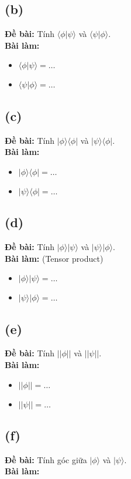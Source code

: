 \subsection{(b)}
\textbf{Đề bài:} Tính $\langle\phi|\psi\rangle$ và $\langle\psi|\phi\rangle$.\\
\textbf{Bài làm:}
\begin{itemize}
    \item $\langle\phi|\psi\rangle = \dots$
    \item $\langle\psi|\phi\rangle = \dots$
\end{itemize}

\subsection{(c)}
\textbf{Đề bài:} Tính $|\phi\rangle\langle\phi|$ và $|\psi\rangle\langle\phi|$.\\
\textbf{Bài làm:}
\begin{itemize}
    \item $|\phi\rangle\langle\phi| = \dots$
    \item $|\psi\rangle\langle\phi| = \dots$
\end{itemize}

\subsection{(d)}
\textbf{Đề bài:} Tính $|\phi\rangle|\psi\rangle$ và $|\psi\rangle|\phi\rangle$.\\
\textbf{Bài làm:} (Tensor product)
\begin{itemize}
    \item $|\phi\rangle|\psi\rangle = \dots$
    \item $|\psi\rangle|\phi\rangle = \dots$
\end{itemize}

\subsection{(e)}
\textbf{Đề bài:} Tính $||\phi||$ và $||\psi||$.\\
\textbf{Bài làm:}
\begin{itemize}
    \item $||\phi|| = \dots$
    \item $||\psi|| = \dots$
\end{itemize}

\subsection{(f)}
\textbf{Đề bài:} Tính góc giữa $|\phi\rangle$ và $|\psi\rangle$.\\
\textbf{Bài làm:}

